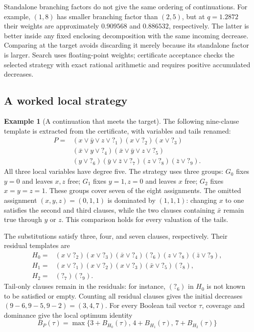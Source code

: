 \documentclass[10pt,twoside]{article}
\newcommand{\tail}[1]{\mathord{?}_{#1}}
\theoremstyle{definition}
\newtheorem{example}{Example}
\theoremstyle{remark}
\begin{document}
Standalone branching factors do not give the same ordering of continuations.
For example, $(1,8)$ has smaller branching factor than $(2,5)$, but at
$q=1.2872$ their weights are approximately $0.909568$ and $0.886532$,
respectively. The latter is better inside any fixed enclosing decomposition
with the same incoming decrease. Comparing at the target avoids discarding
it merely because its standalone factor is larger. Search uses floating-point
weights; certificate acceptance checks the selected strategy with exact
rational arithmetic and requires positive accumulated decreases.

\subsection{A worked local strategy}

\begin{example}[A continuation that meets the target]
\label{ex:group}
The following nine-clause template is extracted from the certificate, with
variables and tails renamed:
\begin{equation}
\begin{split}
 P={}&(x\vee\bar y\vee z\vee\tail{1})(x\vee\tail{2})
       (x\vee\tail{3})\\
    & (\bar x\vee y\vee\tail{4})(\bar x\vee\bar y\vee z\vee\tail{5})\\
    & (y\vee\tail{6})(\bar y\vee\bar z\vee\tail{7})
       (z\vee\tail{8})(\bar z\vee\tail{9}).
\end{split}
\label{eq:example-parent}
\end{equation}
All three local variables have degree five. The strategy uses three groups:
$G_0$ fixes $y=0$ and leaves $x,z$ free; $G_1$ fixes $y=1,z=0$ and leaves
$x$ free; $G_2$ fixes $x=y=z=1$. These groups cover seven of the eight
assignments. The omitted assignment $(x,y,z)=(0,1,1)$ is dominated by
$(1,1,1)$: changing $x$ to one satisfies the second and third clauses,
while the two clauses containing $\bar x$ remain true through $y$ or $z$.
This comparison holds for every valuation of the tails.

The substitutions satisfy three, four, and seven clauses, respectively.
Their residual templates are
\begin{align*}
 H_0={}&(x\vee\tail{2})(x\vee\tail{3})(\bar x\vee\tail{4})
         (\tail{6})(z\vee\tail{8})(\bar z\vee\tail{9}),\\
 H_1={}&(x\vee\tail{1})(x\vee\tail{2})(x\vee\tail{3})
         (\bar x\vee\tail{5})(\tail{8}),\\
 H_2={}&(\tail{7})(\tail{9}).
\end{align*}
Tail-only clauses remain in the residuals: for instance, $(\tail{6})$ in
$H_0$ is not known to be satisfied or empty. Counting all residual clauses
gives the initial decreases $(9-6,9-5,9-2)=(3,4,7)$. For every Boolean tail
vector $\tau$, coverage and dominance give the local optimum identity
\begin{equation}
 B_P(\tau)=\max\{3+B_{H_0}(\tau),\,4+B_{H_1}(\tau),\,7+B_{H_2}(\tau)\}
 \label{eq:example-identity}
\end{equation}


\end{example}
\end{document}
